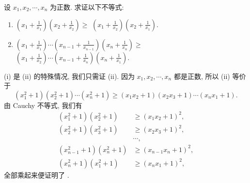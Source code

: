 \begin{prob}
\label{prob:prob-9}
设 $x_1, x_2, \cdots, x_n$ 为正数. 求证以下不等式:
\begin{enumerate}[label=(\roman*)]
  \item $(x_1 + \frac{1}{x_1})(x_2 + \frac{1}{x_2}) \ge$
    $(x_1 + \frac{1}{x_2})(x_2 + \frac{1}{x_1})$.
  \item $(x_1 + \frac{1}{x_1})\cdots (x_{n-1} + \frac{1}{x_{n-1}})(x_n + \frac{1}{x_n}) \ge$
    $(x_1 + \frac{1}{x_2})\cdots (x_{n-1} + \frac{1}{x_n})(x_n + \frac{1}{x_1})$.
\end{enumerate}
\end{prob}

\begin{soln}
(i) 是 (ii) 的特殊情况, 我们只需证 (ii).
因为 $x_1, x_2, \cdots, x_n$ 都是正数, 所以 (ii) 等价于
\begin{equation}
\label{eq:prob-9-eq-1}
(x_1^2 + 1)(x_2^2 + 1) \cdots (x_n^2 + 1) \ge
(x_1x_2 + 1)(x_2x_3 + 1) \cdots (x_nx_1 + 1).
\end{equation}
由 Cauchy 不等式, 我们有
\begin{align*}
(x_1^2 + 1)(x_2^2 + 1) &\ge (x_1x_2 + 1)^2, \\
(x_2^2 + 1)(x_3^2 + 1) &\ge (x_2x_3 + 1)^2, \\
                       &\cdots, \\
(x_{n-1}^2 + 1)(x_n^2 + 1) &\ge (x_{n-1}x_n + 1)^2, \\
(x_n^2 + 1)(x_1^2 + 1) &\ge (x_nx_1 + 1)^2,
\end{align*}
全部乘起来便证明了 .
\end{soln}
